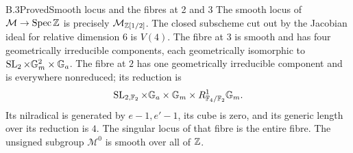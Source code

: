 \begin{statement}{B.3}{Proved}{Smooth locus and the fibres at 2 and 3}
The smooth locus of $\mathcal M\to\operatorname{Spec}\mathbb Z$ is precisely
$\mathcal M_{\mathbb Z[1/2]}$. The closed subscheme cut out by the
Jacobian ideal for relative dimension $6$ is $V(4)$. The fibre
at $3$ is smooth and has four geometrically irreducible
components, each geometrically isomorphic to
$\operatorname{SL}_2\times\mathbb G_m^2\times\mathbb G_a$. The fibre at $2$ has one
geometrically irreducible component and is everywhere nonreduced;
its reduction is
\[
 \operatorname{SL}_{2,\mathbb F_2}\times\mathbb G_a\times\mathbb G_m\times
 R^1_{\mathbb F_4/\mathbb F_2}\mathbb G_m.
\]
Its nilradical is generated by $e-1,e'-1$, its cube is zero,
and its generic length over its reduction is $4$. The singular
locus of that fibre is the entire fibre. The unsigned subgroup
$\mathcal M^0$ is smooth over all of $\mathbb Z$.
\end{statement}
